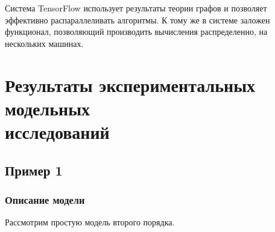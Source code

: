 \documentclass[a4paper,14pt]{extarticle}
\begin{document}
Система TensorFlow использует результаты теории графов и позволяет эффективно 
распараллеливать алгоритмы. К тому же в системе заложен функционал, позволяющий
производить вычисления распределенно, на нескольких машинах.

\newpage
\section[Результаты экспериментальных модельных исследований]
{Результаты экспериментальных модельных \\исследований} 


\subsection{Пример 1}
\subsubsection{Описание модели}
Рассмотрим простую модель второго порядка. 
\end{document}
